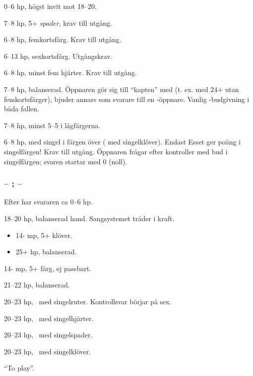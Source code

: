 \bbe
   \item[\spa{1}] 0--6 hp, h\"ogst invit mot 18--20.
   \item[\NT{1}] 7--8 hp, 5+ \emph{spader}, krav till utg{\aa}ng.
   \item[\kl{2}] 6--8 hp, femkortsfärg. Krav till utgång.
     \item[\ru{2}] 6--13 hp, sexkortsfärg. Utgångskrav. \nytt
   \item[\hj{2}] 6--8 hp, minst fem hjärter. Krav 
                        till utg{\aa}ng.
   \item[\spa{2}] 7--8 hp, balanserad. Öppnaren g\"or sig till ``kapten''
                  med  (t. ex. med 24+ utan femkortsf\"arger),
                  bjuder annars som svarare till en
                  -\"oppnare. Vanlig -budgivning i båda fallen.
   \item[\NT{2}] 7--8 hp, minst 5--5 i l{\aa}gf\"argerna.
   \item[\la{3}, \ho{3}] 6--8 hp,  med singel i
                  f\"argen \"over ( med singelkl\"over). Endast Esset
                  ger po\"ang i singelf\"argen!
                  Krav till utg{\aa}ng. Öppnaren fr{\aa}gar efter kontroller
                  med bud i singelf\"argen; svaren startar med 0 (noll).
\ebe

\subsubsection{ -- ;  -- }

Efter  har svararen ca 0--6 hp.

\bbe
   \item[\NT{1}] 18--20 hp, balanserad hand. Sangsystemet tr\"ader i
                 kraft.
   \item[\kl{2}] \begin{itemize}
                   \item 14- mp, 5+ klöver.
                   \item 25+ hp, balanserad.
                  \end{itemize}

   \item[\ru{2},\ho{2}] 14- mp, 5+ färg, ej passbart. 

   \item[\NT{2}] 21--22 hp, balanserad.
   \item[\kl{3}] 20--23 hp, \marmic\ med singelruter. Kontrollsvar börjar på
   sex.
   \item[\ru{3}] 20--23 hp, \marmic\ med singelhjärter.
   \item[\hj{3}] 20--23 hp, \marmic\ med singelspader.	
   \item[\spa{3}] 20--23 hp, \marmic\ med singelklöver.	
   \item[\NT{3}] ``To play''.
\ebe

